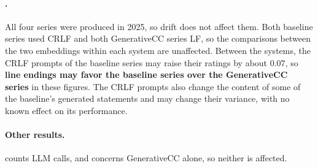 \documentclass[letterpaper]{article} %
\begin{document}
\paragraph{.}
All four series were produced in 2025, so drift does not affect them.
Both baseline series used CRLF and both GenerativeCC series LF, so the comparisons between the two embeddings within each system are unaffected.
Between the systems, the CRLF prompts of the baseline series may raise their ratings by about \(0.07\), so \textbf{line endings may favor the baseline series over the GenerativeCC series} in these figures.
The CRLF prompts also change the content of some of the baseline's generated statements and may change their variance, with no known effect on its performance.

\paragraph{Other results.}
 counts LLM calls, and  concerns GenerativeCC alone, so neither is affected.
\end{document}
